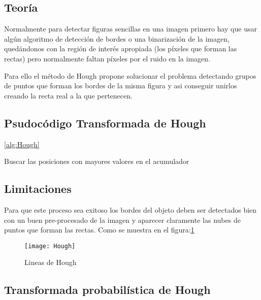 \subsection{Teoría}

Normalmente para detectar figuras sencillas en una imagen primero hay que usar algún algoritmo de detección de bordes o una binarización de la imagen, quedándonos con la región de interés apropiada (los píxeles que forman las rectas) pero normalmente faltan píxeles por el ruido en la imagen.

Para ello el método de Hough propone solucionar el problema detectando grupos de puntos que forman los bordes de la misma figura y asi conseguir unirlos creando la recta real a la que pertenecen.

\subsection{Psudocódigo Transformada de Hough}
\ref{alg:Hough}

\begin{algorithm*}
\DontPrintSemicolon
{}


Buscar las posiciones con mayores valores en el acumulador\;	

\label{alg:Hough}
\end{algorithm*}

\subsection{Limitaciones}
Para que este proceso sea exitoso los bordes del objeto deben ser detectados bien con un buen pre-procesado de la imagen y aparecer claramente las nubes de puntos que forman las rectas.
Como se muestra en el figura:\ref{fig:3.5}

\begin{figure}[h]
\centering
\texttt{[image: Hough]}
\caption{Lineas de Hough\cite{opencv:HoughIm}}
\label{fig:3.5}
\end{figure}
\subsection{Transformada probabilística de Hough}

